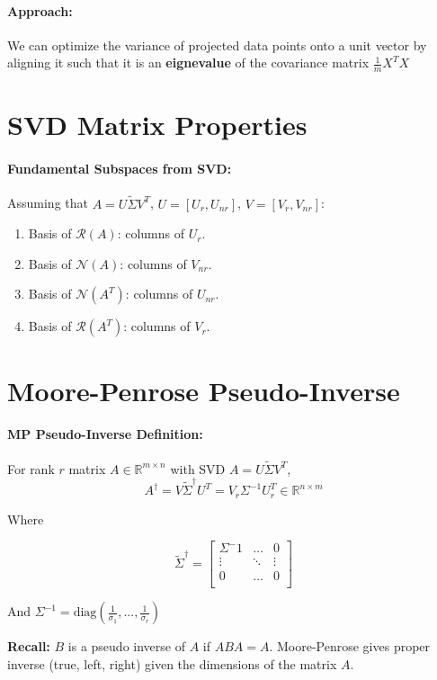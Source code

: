 \documentclass[a4paper,12pt]{report}
\def\reals{\mathbb{R}}
\begin{document}
\paragraph{Approach: } We can optimize the variance of projected data points onto a unit vector by aligning it such that it is an \textbf{eignevalue} of the covariance matrix $\frac{1}{m} X^TX$



\section{SVD Matrix Properties}

\paragraph{Fundamental Subspaces from SVD: } Assuming that $A = U\tilde{\Sigma}V^T$, $U = [U_r, U_{nr}]$, $V = [V_r, V_{nr}]$: 
\begin{enumerate}
\item Basis of $\mathcal{R}(A)$: columns of $U_r$.
\item Basis of $\mathcal{N}(A)$: columns of $V_{nr}$.
\item Basis of $\mathcal{N}(A^T)$: columns of $U_{nr}$.
\item Basis of $\mathcal{R}(A^T)$: columns of $V_r$.
\end{enumerate}

\section{Moore-Penrose Pseudo-Inverse}

\paragraph{MP Pseudo-Inverse Definition: } For rank $r$ matrix $A\in \reals^{m\times n}$ with SVD $A = U\tilde{\Sigma}V^T$, 
\begin{equation}
	A^\dagger = V\tilde{\Sigma}^\dagger U^T = V_r\Sigma^{-1}U_r^T \in \reals^{n\times m}
\end{equation}

Where 

\begin{equation}
\tilde{\Sigma}^\dagger = 
\begin{bmatrix}
	\Sigma^-1 & \dots & 0 \\
	\vdots & \ddots & \vdots \\
	0 & \dots & 0 \\
\end{bmatrix}
\end{equation}

And $\Sigma^{-1} = \text{diag}(\frac{1}{\sigma_1}, ..., \frac{1}{\sigma_r})$

\textbf{Recall: } $B$ is a pseudo inverse of $A$ if $ABA = A$. Moore-Penrose gives proper inverse (true, left, right) given the dimensions of the matrix $A$.
\end{document}
